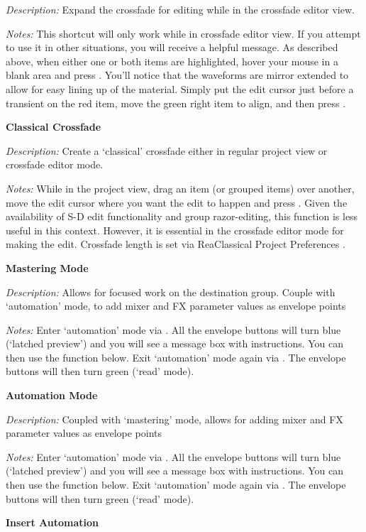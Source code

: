 \documentclass[10pt,american]{article}
\begin{document}
\emph{Description: }Expand the crossfade for editing while in the crossfade
editor view.

\emph{Notes:} This shortcut will only work while in crossfade editor view. If
you attempt to use it in other situations, you will receive a helpful message.
As described above, when either one or both items are highlighted, hover your
mouse in a blank area and press  . You'll notice that the waveforms are
mirror extended to allow for easy lining up of the material. Simply put the edit
cursor just before a transient on the red item, move the green right item to
align, and then press . 

\textbf{Classical Crossfade }

\emph{Description: }Create a `classical' crossfade either in regular project
view or crossfade editor mode.

\emph{Notes: }While in the project view, drag an item (or grouped items) over
another, move the edit cursor where you want the edit to happen and press
. Given the availability of S-D edit functionality and group
razor-editing, this function is less useful in this context. However, it is
essential in the crossfade editor mode for making the edit. Crossfade length is
set via ReaClassical Project Preferences  .

\textbf{Mastering Mode }

\emph{Description:} Allows for focused work on the destination group. Couple
with `automation' mode, to add mixer and FX parameter values as envelope points

\emph{Notes: }Enter `automation' mode via . All the envelope
buttons will turn blue (`latched preview') and you will see a message box with
instructions. You can then use the function below. Exit `automation' mode again
via . The envelope buttons will then turn green (`read' mode).

\textbf{Automation Mode }

\emph{Description: }Coupled with `mastering' mode, allows for adding mixer and
FX parameter values as envelope points

\emph{Notes: }Enter `automation' mode via . All the envelope
buttons will turn blue (`latched preview') and you will see a message box with
instructions. You can then use the function below. Exit `automation' mode again
via . The envelope buttons will then turn green (`read' mode).

\textbf{Insert Automation }
\end{document}
